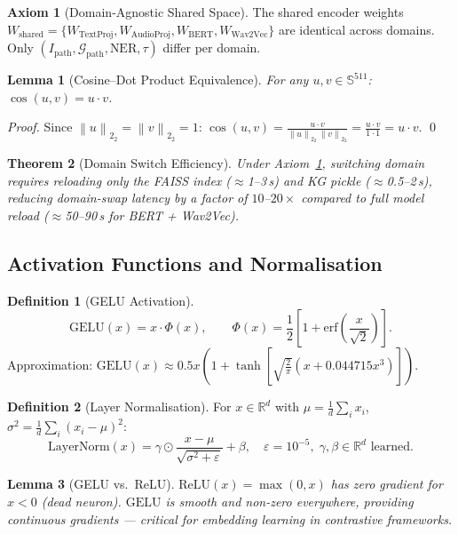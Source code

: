 \documentclass[12pt,a4paper]{article}
\theoremstyle{definition}
\newtheorem{definition}{Definition}[section]
\newtheorem{axiom}{Axiom}[section]
\theoremstyle{plain}
\newtheorem{theorem}{Theorem}[section]
\newtheorem{lemma}[theorem]{Lemma}
\theoremstyle{remark}
\newcommand{\R}{\mathbb{R}}
\newcommand{\Sph}{\mathbb{S}}
\newcommand{\Norm}[1]{\left\|#1\right\|_2}
\newcommand{\KG}{\mathcal{G}}
\newcommand{\LN}{\mathrm{LayerNorm}}
\newcommand{\GELU}{\mathrm{GELU}}
\begin{document}
\begin{axiom}[Domain-Agnostic Shared Space]
\label{ax:shared}
The shared encoder weights
$W_{\text{shared}} = \{W_{\text{TextProj}}, W_{\text{AudioProj}}, W_{\text{BERT}}, W_{\text{Wav2Vec}}\}$
are identical across domains. Only $(I_{\text{path}}, \KG_{\text{path}}, \text{NER}, \tau)$ differ per domain.
\end{axiom}

\begin{lemma}[Cosine--Dot Product Equivalence]
\label{lem:cosdot}
For any $u, v \in \Sph^{511}$: $\cos(u, v) = u \cdot v$.
\end{lemma}
\begin{proof}
Since $\Norm{u}_2 = \Norm{v}_2 = 1$:
$\cos(u,v) = \frac{u \cdot v}{\Norm{u}_2\,\Norm{v}_2} = \frac{u \cdot v}{1 \cdot 1} = u \cdot v.$ \qed
\end{proof}

\begin{theorem}[Domain Switch Efficiency]
\label{thm:switch}
Under Axiom~\ref{ax:shared}, switching domain requires reloading only the FAISS index ($\approx$1--3\,s) and KG pickle ($\approx$0.5--2\,s), reducing domain-swap latency by a factor of $10$--$20\times$ compared to full model reload ($\approx$50--90\,s for BERT + Wav2Vec).
\end{theorem}

\subsection{Activation Functions and Normalisation}

\begin{definition}[GELU Activation]
\[
  \GELU(x) = x \cdot \Phi(x), \qquad \Phi(x) = \frac{1}{2}\left[1 + \text{erf}\!\left(\frac{x}{\sqrt{2}}\right)\right].
\]
Approximation: $\GELU(x) \approx 0.5x\!\left(1 + \tanh\!\left[\sqrt{\tfrac{2}{\pi}}\left(x + 0.044715x^3\right)\right]\right)$.
\end{definition}

\begin{definition}[Layer Normalisation]
For $x \in \R^d$ with $\mu = \frac{1}{d}\sum_i x_i$, $\sigma^2 = \frac{1}{d}\sum_i (x_i - \mu)^2$:
\[
  \LN(x) = \gamma \odot \frac{x - \mu}{\sqrt{\sigma^2 + \varepsilon}} + \beta, \quad \varepsilon = 10^{-5},\; \gamma, \beta \in \R^d \text{ learned.}
\]
\end{definition}

\begin{lemma}[GELU vs.\ ReLU]
$\text{ReLU}(x) = \max(0,x)$ has zero gradient for $x < 0$ (dead neuron). $\GELU$ is smooth and non-zero everywhere, providing continuous gradients --- critical for embedding learning in contrastive frameworks.
\end{lemma}
\end{document}
